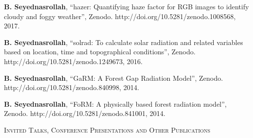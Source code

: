 \documentclass[10pt]{article}
\newenvironment{changemargin}[2]{%
  \begin{list}{}{%
 \setlength{\topsep}{0pt}%
 \setlength{\leftmargin}{#1}%
 \setlength{\rightmargin}{#2}%
 \setlength{\listparindent}{\parindent}%
 \setlength{\itemindent}{\parindent}%
 \setlength{\parsep}{\parskip}%
  }%
  \item[]}{\end{list}
}
\newcommand{\lineover}{
  \begin{changemargin}{-0.05in}{-0.05in}
  \vspace*{-8pt}
  \hrulefill \\
  \vspace*{-2pt}
  \end{changemargin}
}
\newcommand{\header}[1]{
  \begin{changemargin}{-0.5in}{-0.5in}
  \scshape{#1}\\
  \lineover
  \end{changemargin}
}
\newenvironment{body} {
  \vspace*{-2pt}
  \begin{changemargin}{-0.5in}{-0.5in}
}
{\end{changemargin}
}
\begin{document}
\begin{body}
\begin{etaremune}
    \item \textbf{B. Seyednasrollah}, ``hazer: Quantifying haze factor for RGB images to identify cloudy and foggy weather'', Zenodo. http://doi.org/10.5281/zenodo.1008568, 2017. \\ \medskip

    \item \textbf{B. Seyednasrollah}, ``solrad: To calculate solar radiation and related variables based on location, time and topographical conditions'', Zenodo. http://doi.org/10.5281/zenodo.1249673, 2016. \\
    \medskip

    \item \textbf{B. Seyednasrollah}, ``GaRM: A Forest Gap Radiation Model'', Zenodo. http://doi.org/10.5281/zenodo.840998, 2014. \\
    \medskip

    \item \textbf{B. Seyednasrollah}, ``FoRM: A physically based forest radiation model'', Zenodo. http://doi.org/10.5281/zenodo.841001, 2014. \\
    \medskip

  \end{etaremune}

\end{body}

\medskip



\header{Invited Talks, Conference Presentations and Other Publications}
\end{document}
